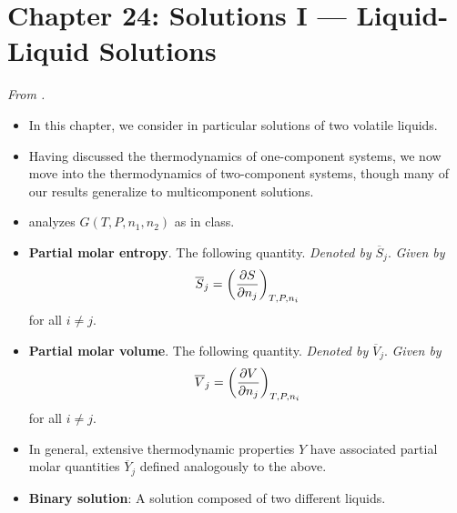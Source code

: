 \documentclass[../notes.tex]{subfiles}
\begin{document}
\section{Chapter 24: Solutions I --- Liquid-Liquid Solutions}
\emph{From \textcite{bib:McQuarrieSimon}.}
\begin{itemize}
    \item {}In this chapter, we consider in particular solutions of two volatile liquids.
    \item Having discussed the thermodynamics of one-component systems, we now move into the thermodynamics of two-component systems, though many of our results generalize to multicomponent solutions.
    \item \textcite{bib:McQuarrieSimon} analyzes $G(T,P,n_1,n_2)$ as in class.
    \item \textbf{Partial molar entropy}. The following quantity. \emph{Denoted by} $\overline{S}_j$. \emph{Given by}
    \begin{equation*}
        \overline{S}_j = \left( \pdv{S}{n_j} \right)_{T,P,n_i}
    \end{equation*}
    for all $i\neq j$.
    \item \textbf{Partial molar volume}. The following quantity. \emph{Denoted by} $\overline{V}_j$. \emph{Given by}
    \begin{equation*}
        \overline{V}_j = \left( \pdv{V}{n_j} \right)_{T,P,n_i}
    \end{equation*}
    for all $i\neq j$.
    \item In general, extensive thermodynamic properties $Y$ have associated partial molar quantities $\overline{Y}_j$ defined analogously to the above.
    \item \textbf{Binary solution}: A solution composed of two different liquids.
\end{itemize}
\end{document}
